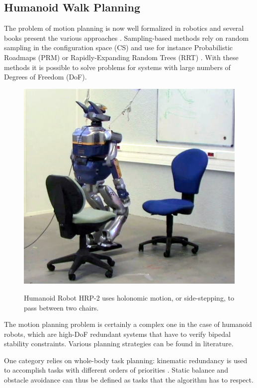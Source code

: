 \subsection{Humanoid Walk Planning}
\label{subsec:humanoid-walk-planning}
\noindent The problem of motion planning is now well formalized in
robotics and several books present the various approaches
\cite{lato91,chos05,lava06}. Sampling-based methods rely on random
sampling in the configuration space (CS) and use for instance
Probabilistic Roadmaps (PRM) \cite{kavr96} or Rapidly-Expanding Random
Trees (RRT) \cite{kuff00}. With these methods it is possible to solve
problems for systems with large numbers of Degrees of Freedom (DoF).
\begin{figure}
  \centering
      {\includegraphics[width = \linewidth]{src/chap1-path-optimization/hrp2-chairs.png}}
      \caption{Humanoid Robot HRP-2 uses holonomic motion, or
        side-stepping, to pass between two chairs.}
      \label{fig:hrp2-chairs}
\end{figure}

The motion planning problem is certainly a complex one in the case of
humanoid robots, which are high-DoF redundant systems that have to
verify bipedal stability constraints. Various planning strategies can be found
in literature.

One category relies on whole-body task planning: kinematic redundancy
is used to accomplish tasks with different orders of priorities
\cite{khat04,kano09}. Static balance and obstacle avoidance can
thus be defined as tasks that the algorithm has to respect.

